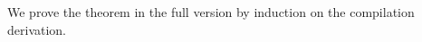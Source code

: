 We prove the theorem in the full version by induction on the compilation derivation. %
%
%
%
%
%  
%

